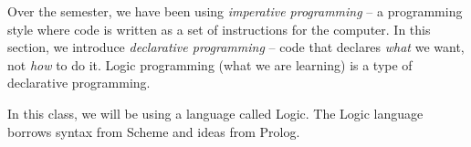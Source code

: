 Over the semester, we have been using \textit{imperative programming} -- a
programming style where code is written as a set of instructions for the
computer.  In this section, we introduce \textit{declarative programming} --
code that declares \textit{what} we want, not \textit{how} to do it. Logic
programming (what we are learning) is a type of declarative programming.

In this class, we will be using a language called Logic. The Logic language
borrows syntax from Scheme and ideas from Prolog.
